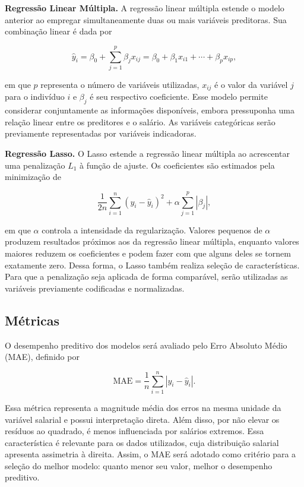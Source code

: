 \textbf{Regressão Linear Múltipla.} A regressão linear múltipla estende o modelo anterior ao empregar simultaneamente duas ou mais variáveis preditoras. Sua combinação linear é dada por

\begin{equation}
    \widehat{y}_i = \beta_0 + \sum_{j=1}^{p} \beta_j x_{ij}
    = \beta_0 + \beta_1 x_{i1} + \cdots + \beta_p x_{ip},
\end{equation}

\noindent em que $p$ representa o número de variáveis utilizadas, $x_{ij}$ é o valor da variável $j$ para o indivíduo $i$ e $\beta_j$ é seu respectivo coeficiente. Esse modelo permite considerar conjuntamente as informações disponíveis, embora pressuponha uma relação linear entre os preditores e o salário. As variáveis categóricas serão previamente representadas por variáveis indicadoras.

\textbf{Regressão Lasso.} O Lasso estende a regressão linear múltipla ao acrescentar uma penalização $L_1$ à função de ajuste. Os coeficientes são estimados pela minimização de

\begin{equation}
    \frac{1}{2n}\sum_{i=1}^{n}\left(y_i-\widehat{y}_i\right)^2
    + \alpha\sum_{j=1}^{p}\left|\beta_j\right|,
\end{equation}

\noindent em que $\alpha$ controla a intensidade da regularização. Valores pequenos de $\alpha$ produzem resultados próximos aos da regressão linear múltipla, enquanto valores maiores reduzem os coeficientes e podem fazer com que alguns deles se tornem exatamente zero. Dessa forma, o Lasso também realiza seleção de características. Para que a penalização seja aplicada de forma comparável, serão utilizadas as variáveis previamente codificadas e normalizadas.

\subsection{Métricas}

O desempenho preditivo dos modelos será avaliado pelo Erro Absoluto Médio (MAE), definido por

\begin{equation}
    \mathrm{MAE} = \frac{1}{n}\sum_{i=1}^{n}\left|y_i - \widehat{y}_i\right|.
\end{equation}

\noindent Essa métrica representa a magnitude média dos erros na mesma unidade da variável salarial e possui interpretação direta. Além disso, por não elevar os resíduos ao quadrado, é menos influenciada por salários extremos. Essa característica é relevante para os dados utilizados, cuja distribuição salarial apresenta assimetria à direita. Assim, o MAE será adotado como critério para a seleção do melhor modelo: quanto menor seu valor, melhor o desempenho preditivo.

